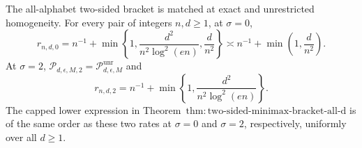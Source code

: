 The all-alphabet two-sided bracket is matched at exact and unrestricted homogeneity.  For every pair of integers \(n,d\ge1\), at \(\sigma=0\),
\[
 r_{n,d,0}=n^{-1}+\min\left\{1,\frac{d^2}{n^2\log^2(en)},\frac d{n^2}\right\}
 \asymp n^{-1}+\min\left(1,\frac d{n^2}\right).
\]
At \(\sigma=2\), \(\mathcal P_{d,\epsilon,M,2}=\mathcal P_{d,\epsilon,M}^{\mathrm{unr}}\) and
\[
 r_{n,d,2}=n^{-1}+\min\left\{1,\frac{d^2}{n^2\log^2(en)}\right\}.
\]
The capped lower expression in Theorem~\(\mathrm{thm:two\text{-}sided\text{-}minimax\text{-}bracket\text{-}all\text{-}d}\) is of the same order as these two rates at \(\sigma=0\) and \(\sigma=2\), respectively, uniformly over all \(d\ge1\).